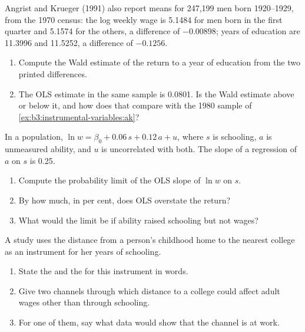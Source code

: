 \begin{exercise}[$\star$]\label{exo:b3:instrumental-variables:2}
Angrist and Krueger (1991) also report means for 247{,}199 men born 1920--1929,
from the 1970 census: the log weekly wage is 5.1484 for men born in the first
quarter and 5.1574 for the others, a difference of $-0.00898$; years of
education are 11.3996 and 11.5252, a difference of $-0.1256$.
\begin{enumerate}
\item Compute the Wald estimate of the return to a year of education from the
two printed differences.
\item The OLS estimate in the same sample is 0.0801. Is the Wald estimate
above or below it, and how does that compare with the 1980 sample of
\cref{ex:b3:instrumental-variables:ak}?
\end{enumerate}
\end{exercise}

\begin{exercise}[$\star$]\label{exo:b3:instrumental-variables:3}
In a population, $\ln w = \beta_0 + 0.06\, s + 0.12\, a + u$, where $s$ is
schooling, $a$ is unmeasured ability, and $u$ is uncorrelated with both. The
slope of a regression of $a$ on $s$ is 0.25.
\begin{enumerate}
\item Compute the probability limit of the OLS slope of $\ln w$ on $s$.
\item By how much, in per cent, does OLS overstate the return?
\item What would the limit be if ability raised schooling but not wages?
\end{enumerate}
\end{exercise}

\begin{exercise}[$\star$]\label{exo:b3:instrumental-variables:4}
A study uses the distance from a person's childhood home to the nearest
college as an instrument for her years of schooling.
\begin{enumerate}
\item State the  and the  for this
instrument in words.
\item Give two channels through which distance to a college could affect
adult wages other than through schooling.
\item For one of them, say what data would show that the channel is at
work.
\end{enumerate}
\end{exercise}

